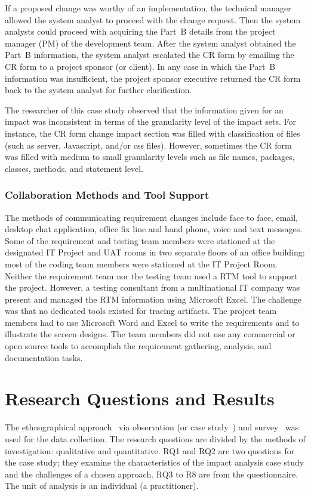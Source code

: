 \documentclass[conference]{IEEEtran}
\begin{document}
If a proposed change was worthy of an implementation, the technical
manager allowed the system analyst to proceed with the change
request. Then the system analysts could proceed with acquiring the
Part~B details from the project manager (PM) of the development
team. After the system analyst obtained the Part~B information, the
system analyst escalated the CR form by emailing the CR form to a
project sponsor (or client). In any case in which the Part~B
information was insufficient, the project sponsor executive returned
the CR form back to the system analyst for further clarification.

The researcher of this case study observed that the information given
for an impact was inconsistent in terms of the granularity level of
the impact sets. For instance, the CR form change impact section was
filled with classification of files (such as server, Javascript,
and/or css files). However, sometimes the CR form was filled with
medium to small granularity levels such as file names, packages,
classes, methods, and statement level.

\subsubsection{Collaboration Methods and Tool Support}

The methods of communicating requirement changes include face to face,
email, desktop chat application, office fix line and hand phone, voice
and text messages. Some of the requirement and testing team members
were stationed at the designated IT Project and UAT rooms in two
separate floors of an office building; most of the coding team members
were stationed at the IT Project Room. Neither the requirement team
nor the testing team used a RTM tool to support the project. However,
a testing consultant from a multinational IT company was present and
managed the RTM information using Microsoft Excel. The challenge was
that no dedicated tools existed for tracing artifacts. The project
team members had to use Microsoft Word and Excel to write the
requirements and to illustrate the screen designs. The team members
did not use any commercial or open source tools to accomplish the
requirement gathering, analysis, and documentation tasks.

\section{Research Questions and Results}

The ethnographical approach~\cite{viller2000ethnographically} via
observation (or case study~\cite{runeson2009guidelines}) and
survey~\cite{kasunic2005designing} was used for the data
collection. The research questions are divided by the methods of
investigation: qualitative and quantitative. RQ1 and RQ2 are two
questions for the case study; they examine the characteristics of the
impact analysis case study and the challenges of a chosen
approach. RQ3 to R8 are from the questionnaire. The unit of analysis
is an individual (a practitioner).
\end{document}
